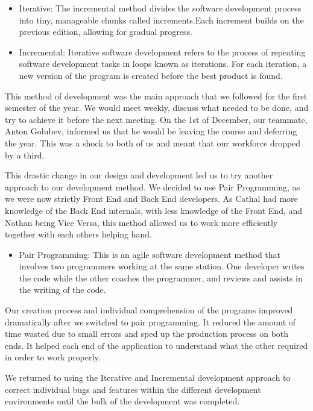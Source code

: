 \begin{itemize}
    \item Iterative: The incremental method divides the software development process into tiny, manageable chunks called increments.Each increment builds on the previous edition, allowing for gradual progress. 
    \item Incremental: Iterative software development refers to the process of repeating software development tasks in loops known as iterations. For each iteration, a new version of the program is created before the best product is found. 
\end{itemize}

This method of development was the main approach that we followed for the first semester of the year. We would meet weekly, discuss what needed to be done, and try to achieve it before the next meeting. On the 1st of December, our teammate, Anton Golubev, informed us that he would be leaving the course and deferring the year. This was a shock to both of us and meant that our workforce dropped by a third. \par
This drastic change in our design and development led us to try another approach to our development method. We decided to use Pair Programming, as we were now strictly Front End and Back End developers. As Cathal had more knowledge of the Back End internals, with less knowledge of the Front End, and Nathan being Vice Versa, this method allowed us to work more efficiently together with each others helping hand. \par
\begin{itemize}
    \item Pair Programming: This is an agile software development method that involves two programmers working at the same station. One developer writes the code while the other coaches the programmer, and reviews and assists in the writing of the code.
\end{itemize}
\par Our creation process and individual comprehension of the programs improved dramatically after we switched to pair programming.
It reduced the amount of time wasted due to small errors and sped up the production process on both ends. It helped each end of the application to understand what the other required in order to work properly.  \par
We returned to using the Iterative and Incremental development approach to correct individual bugs and features within the different development environments until the bulk of the development was completed. 

